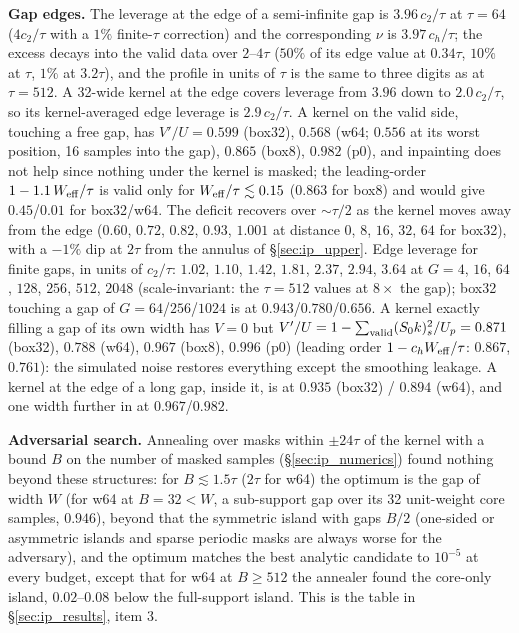 \documentclass{article}
\numberwithin{equation}{section}   %
\begin{document}
{\bf Gap edges.}  The leverage at the edge of a semi-infinite gap is $3.96\,c_2/\tau$ at $\tau = 64$
($4c_2/\tau$ with a $1\%$ finite-$\tau$ correction) and the corresponding $\nu$ is $3.97\,c_h/\tau$; the
excess decays into the valid data over $2$--$4\tau$ ($50\%$ of its edge value at $0.34\tau$, $10\%$ at
$\tau$, $1\%$ at $3.2\tau$), and the profile in units of $\tau$ is the same to three digits as at
$\tau = 512$.  A 32-wide kernel at the edge covers leverage from $3.96$ down to $2.0\,c_2/\tau$, so its
kernel-averaged edge leverage is $2.9\,c_2/\tau$.  A kernel on the valid side, touching a free gap, has
$V'/U = 0.599$ (box32), $0.568$ (w64; $0.556$ at its worst position, 16 samples into the gap), $0.865$
(box8), $0.982$ (p0), and inpainting does not help since nothing under the kernel is masked; the
leading-order $1 - 1.1\,W_{\rm eff}/\tau$ is valid only for $W_{\rm eff}/\tau \lesssim 0.15$ ($0.863$
for box8) and would give $0.45$/$0.01$ for box32/w64.  The deficit recovers over $\sim\tau/2$ as the
kernel moves away from the edge ($0.60$, $0.72$, $0.82$, $0.93$, $1.001$ at distance $0$, $8$, $16$, $32$,
$64$ for box32), with a $-1\%$ dip at $2\tau$ from the annulus of \S\ref{sec:ip_upper}.  Edge leverage
for finite gaps, in units of $c_2/\tau$: $1.02$, $1.10$, $1.42$, $1.81$, $2.37$, $2.94$, $3.64$ at
$G = 4$, $16$, $64$, $128$, $256$, $512$, $2048$ (scale-invariant: the $\tau = 512$ values at $8\times$
the gap); box32 touching a gap of $G = 64$/$256$/$1024$ is at $0.943$/$0.780$/$0.656$.  A kernel exactly
filling a gap of its own width has $V = 0$ but $V'/U = 1 - \sum_{\rm valid}(S_0k)_s^2/U_p = 0.871$
(box32), $0.788$ (w64), $0.967$ (box8), $0.996$ (p0) (leading order $1 - c_h W_{\rm eff}/\tau$: $0.867$,
$0.761$): the simulated noise restores everything except the smoothing leakage.  A kernel at the edge of
a long gap, inside it, is at $0.935$ (box32) / $0.894$ (w64), and one width further in at $0.967$/$0.982$.

{\bf Adversarial search.}  Annealing over masks within $\pm 24\tau$ of the kernel with a bound $B$ on the
number of masked samples (\S\ref{sec:ip_numerics}) found nothing beyond these structures: for
$B \lesssim 1.5\tau$ ($2\tau$ for w64) the optimum is the gap of width $W$ (for w64 at $B = 32 < W$, a
sub-support gap over its 32 unit-weight core samples, $0.946$), beyond that the symmetric island with
gaps $B/2$ (one-sided or asymmetric islands and sparse periodic masks are always worse for the
adversary), and the optimum matches the best analytic candidate to $10^{-5}$ at every budget, except
that for w64 at $B \ge 512$ the annealer found the core-only island, $0.02$--$0.08$ below the
full-support island.  This is the table in \S\ref{sec:ip_results}, item 3.
\end{document}
